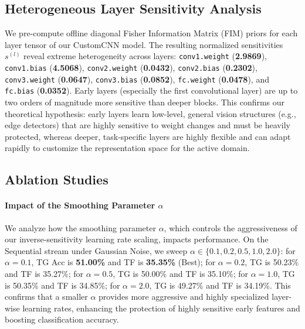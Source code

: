 \documentclass{article}
\begin{document}
\subsection{Heterogeneous Layer Sensitivity Analysis}
We pre-compute offline diagonal Fisher Information Matrix (FIM) priors for each layer tensor of our CustomCNN model. The resulting normalized sensitivities $s^{(l)}$ reveal extreme heterogeneity across layers: \texttt{conv1.weight} (\textbf{2.9869}), \texttt{conv1.bias} (\textbf{4.5068}), \texttt{conv2.weight} (\textbf{0.0432}), \texttt{conv2.bias} (\textbf{0.2302}), \texttt{conv3.weight} (\textbf{0.0647}), \texttt{conv3.bias} (\textbf{0.0852}), \texttt{fc.weight} (\textbf{0.0478}), and \texttt{fc.bias} (\textbf{0.0352}). Early layers (especially the first convolutional layer) are up to two orders of magnitude more sensitive than deeper blocks. This confirms our theoretical hypothesis: early layers learn low-level, general vision structures (e.g., edge detectors) that are highly sensitive to weight changes and must be heavily protected, whereas deeper, task-specific layers are highly flexible and can adapt rapidly to customize the representation space for the active domain.

\subsection{Ablation Studies}

\paragraph{Impact of the Smoothing Parameter $\alpha$}
We analyze how the smoothing parameter $\alpha$, which controls the aggressiveness of our inverse-sensitivity learning rate scaling, impacts performance. On the Sequential stream under Gaussian Noise, we sweep $\alpha \in \{0.1, 0.2, 0.5, 1.0, 2.0\}$:
for $\alpha = 0.1$, TG Acc is \textbf{51.00\%} and TF is \textbf{35.35\%} (Best);
for $\alpha = 0.2$, TG is 50.23\% and TF is 35.27\%;
for $\alpha = 0.5$, TG is 50.00\% and TF is 35.10\%;
for $\alpha = 1.0$, TG is 50.35\% and TF is 34.85\%;
for $\alpha = 2.0$, TG is 49.27\% and TF is 34.19\%.
This confirms that a smaller $\alpha$ provides more aggressive and highly specialized layer-wise learning rates, enhancing the protection of highly sensitive early features and boosting classification accuracy.
\end{document}
